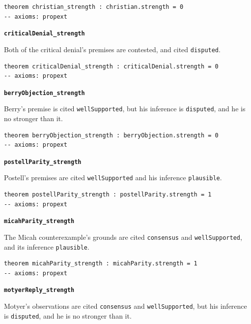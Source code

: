 \documentclass[11pt]{article}
\begin{document}
{\small\begin{verbatim}
theorem christian_strength : christian.strength = 0
-- axioms: propext
\end{verbatim}}
\par\medskip\noindent\textbf{\texttt{critical\allowbreak{}Denial\_\allowbreak{}strength}}\par\nobreak\noindent
Both of the critical denial's premises are contested, and cited \texttt{disputed}.

{\small\begin{verbatim}
theorem criticalDenial_strength : criticalDenial.strength = 0
-- axioms: propext
\end{verbatim}}
\par\medskip\noindent\textbf{\texttt{berry\allowbreak{}Objection\_\allowbreak{}strength}}\par\nobreak\noindent
Berry's premise is cited \texttt{well\allowbreak{}Supported}, but his inference is \texttt{disputed}, and he is no stronger than it.

{\small\begin{verbatim}
theorem berryObjection_strength : berryObjection.strength = 0
-- axioms: propext
\end{verbatim}}
\par\medskip\noindent\textbf{\texttt{postell\allowbreak{}Parity\_\allowbreak{}strength}}\par\nobreak\noindent
Postell's premises are cited \texttt{well\allowbreak{}Supported} and his inference \texttt{plausible}.

{\small\begin{verbatim}
theorem postellParity_strength : postellParity.strength = 1
-- axioms: propext
\end{verbatim}}
\par\medskip\noindent\textbf{\texttt{micah\allowbreak{}Parity\_\allowbreak{}strength}}\par\nobreak\noindent
The Micah counterexample's grounds are cited \texttt{consensus} and \texttt{well\allowbreak{}Supported}, and its inference \texttt{plausible}.

{\small\begin{verbatim}
theorem micahParity_strength : micahParity.strength = 1
-- axioms: propext
\end{verbatim}}
\par\medskip\noindent\textbf{\texttt{motyer\allowbreak{}Reply\_\allowbreak{}strength}}\par\nobreak\noindent
Motyer's observations are cited \texttt{consensus} and \texttt{well\allowbreak{}Supported}, but his inference is \texttt{disputed}, and he is no stronger than it.
\end{document}
